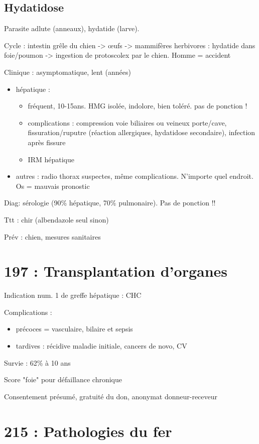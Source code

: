 \documentclass[11pt]{article}
\begin{document}
\subsection{Hydatidose}
\label{sec:orgad6a46b}
Parasite adlute (anneaux), hydatide (larve).

Cycle : intestin grêle du chien -> \oe{}ufs -> mammifères herbivores : hydatide
dans foie/poumon -> ingestion de protoscolex par le chien. Homme = accident

Clinique : asymptomatique, lent (années)
\begin{itemize}
\item hépatique : 
\begin{itemize}
\item fréquent, 10-15ans. HMG isolée, indolore, bien toléré.  pas
de ponction !
\item complications : compression voie biliaires ou veineux porte/cave,
fissuration/ruputre (réaction allergiques, hydatidose secondaire),
infection après fissure
\item IRM hépatique
\end{itemize}
\item autres : radio thorax suspectes, même complications. N'importe quel
endroit. Os = mauvais pronostic
\end{itemize}

Diag: sérologie (90\% hépatique, 70\% pulmonaire). Pas de ponction !!

Ttt : chir (albendazole seul sinon)

Prév : chien, mesures sanitaires
\section{197 : Transplantation d'organes}
\label{sec:org036554a}
Indication num. 1 de greffe hépatique : CHC

Complications :
\begin{itemize}
\item précoces = vasculaire, bilaire et sepsis
\item tardives : récidive maladie initiale, cancers de novo, CV
\end{itemize}

Survie : 62\% à 10 ans

Score "foie" pour défaillance chronique

Consentement présumé, gratuité du don, anonymat donneur-receveur
\section{215 : Pathologies du fer}
\label{sec:org0a499f7}
\end{document}
